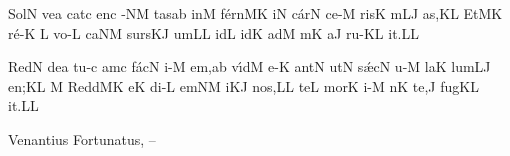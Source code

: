 \smallskip

\initiumgregorianum
{}%
\sgn S{o}l\punctum N\egn
\sgn ve{}\punctum a\egn
\spatium
\sgn cat\punctum c\egn
\sgn {}en\punctum c\egn
{}-\clivis NM\egn
\sgn tas\punctum a\augmentum b\egn
\spatium
\divisiominima
\spatium
\sgn {}in\punctum M\egn
\sgn f{\'e}{rn}\clivis MK\egn
\sgn {}i{}\punctum N\egn
\spatium
\sgn c{\'a}r\punctum N\egn
\sgn ce-\punctum M\egn
\sgn ris\punctum K\egn
\spatium
{}m\clivis LJ\egn
{}a{s,}\punctum K\augmentum L\egn
\spatium
\divisiominor
\spatium
\sgn {}Et\clivis MK\egn
\spatium
\sgn r{\'e}-\punctum K\egn
\custos L
\lineaproxima
\sgn vo-\punctum L\egn
\sgn ca{}\clivis NM\egn
\spatium
\sgn s{u}{rs}\clivis KJ\egn
\sgn {}um\punctum L\augmentum L\egn
\spatium
\divisiominima
\spatium
{}id\punctum L\egn
{}id\punctum K\egn
\spatium
\sgn {}ad\punctum M\egn
\spatium
{}m\punctum K\egn
\sgn {}a{}\punctum J\egn
\spatium
\sgn r{u}-\pes KL\egn
\sgn {}i{t.}\punctum L\augmentum L\egn
\Finisgregoriana



\smallskip

\initiumgregorianum
{}%
\sgn R{e}d\punctum N\egn
\sgn de{}\punctum a\egn
\spatium
\sgn t{u}-\punctum c\egn
\sgn {}am\punctum c\egn
\spatium
\sgn f{\'a}c\punctum N\egn
\sgn {}i-\punctum M\egn
\sgn {}e{m,}\punctum a\augmentum b\egn
\spatium
\divisiominima
\spatium
\sgn v{\'\i}d\punctum M\egn
\sgn {}e-\punctum K\egn
\sgn {}a{nt}\punctum N\egn
\spatium
\sgn {}ut\punctum N\egn
\spatium
\sgn s{\'\ae}c\punctum N\egn
\sgn {}u-\punctum M\egn
\sgn la{}\punctum K\egn
\spatium
\sgn lum\clivis LJ\egn
\sgn {}e{n;}\punctum K\augmentum L\egn
\spatium
\divisiominor
\spatium
\custos M
\lineaproxima
\sgn R{e}{dd}\clivis MK\egn
\sgn {}e{}\punctum K\egn
\spatium
\sgn d{i}-\punctum L\egn
\sgn {}em\clivis NM\egn
\spatium
{}i{}\clivis KJ\egn
\spatium
\sgn no{s,}\punctum L\augmentum L\egn
\spatium
\divisiominima
\spatium
\sgn te{}\punctum L\egn
\spatium
\sgn mor\punctum K\egn
\sgn {}i-\punctum M\egn
{}n\punctum K\egn
\sgn te,\punctum J\egn
\spatium
\sgn f{u}g\pes KL\egn
\sgn {}i{t.}\punctum L\augmentum L\egn
\Finisgregoriana


\medskip

\source Venantius Fortunatus, {}-- 

